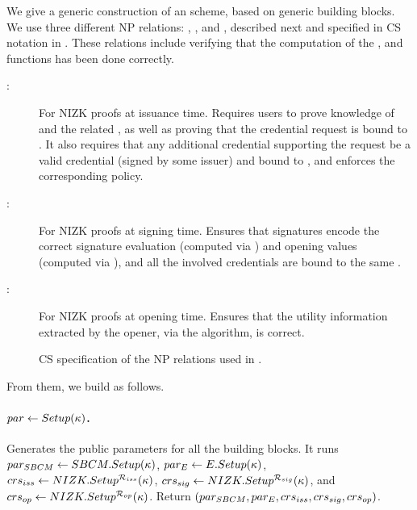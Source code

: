 We give a generic construction of an \UAS scheme, based on
generic building blocks. We use three different NP relations: \RelIss, \RelSig,
and \RelIns, described next and specified in CS notation \cite{cs97} in
. These relations include verifying that the computation of
the \fissue, \feval and \finsp functions has been done correctly.

\begin{description}
\item[\RelIss:] For NIZK proofs at issuance time. Requires users to
  prove knowledge of \usk and the related \upk, as well as proving that the
  credential request is bound to \usk. It also requires that any additional
  credential supporting the request be a valid credential (signed by some
  issuer) and bound to \upk, and enforces the corresponding \fissue policy.
\item[\RelSig:] For NIZK proofs at signing time. Ensures that
  signatures encode the correct signature evaluation (computed via \feval)
  and opening values (computed via \finsp), and all the involved
  credentials are bound to the same \upk.
\item[\RelIns:] For NIZK proofs at opening time. Ensures that the
  utility information extracted by the opener, via the \Open algorithm, is
  correct.
\end{description}

\begin{figure}[ht!]
  \centering
  \scalebox{0.85}{
    
  }
  \caption{CS specification of the NP relations used in \CUASGen.
  }
  \label{fig:nizkrels}
\end{figure}

From them, we build \CUASGen as follows.

\paragraph{$par \gets Setup(\kappa)$.} %
Generates the public parameters for all the building blocks. It runs
$par_{SBCM} \gets SBCM.Setup(\kappa)$, $par_{E} \gets E.Setup(\kappa)$,
$crs_{iss} \gets NIZK.Setup^{\mathcal{R}_{iss}}(\kappa)$,
$crs_{sig} \gets NIZK.Setup^{\mathcal{R}_{sig}}(\kappa)$, and
$crs_{op} \gets NIZK.Setup^{\mathcal{R}_{op}}(\kappa)$. Return
$(par_{SBCM},par_{E},crs_{iss},crs_{sig},crs_{op})$.


